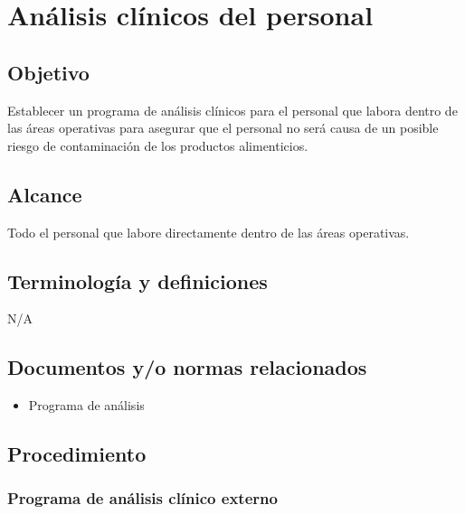 \renewcommand{\MayorVer}{2}
\renewcommand{\MenorVer}{1}
\renewcommand{\Codigo}{BPD-7-POL}
\renewcommand{\FechaPub}{2023--01}
\renewcommand{\Titulo}{Análisis clínicos del personal}
\section{\Titulo}

\subsection{Objetivo}

Establecer un programa de análisis clínicos para el personal que labora dentro de las áreas operativas para asegurar que el personal no será causa de un posible riesgo de contaminación de los productos alimenticios.

\subsection{Alcance}

Todo el personal que labore directamente dentro de las áreas operativas.

\subsection{Terminología y definiciones}

N/A

\subsection{Documentos y/o normas relacionados}

\begin{itemize}
	\item Programa de análisis
\end{itemize}

\subsection{Procedimiento}

\subsubsection{Programa de análisis clínico externo}

